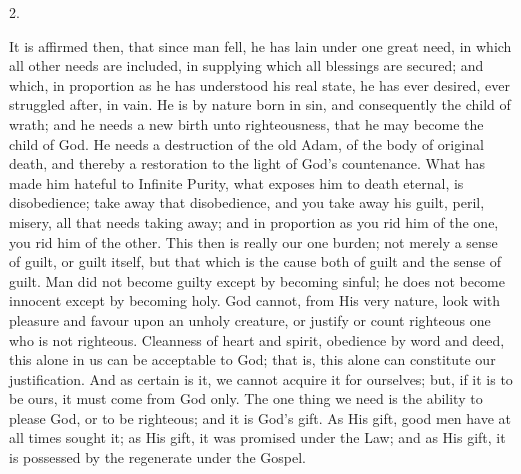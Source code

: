 2.

It is affirmed then, that since man fell, he has lain under one
great need, in which all other needs are included, in supplying which
all blessings are secured; and which, in proportion as he has
understood his real state, he has ever desired, ever struggled after,
in vain. He is by nature born in sin, and consequently the child of
wrath; and he needs a new birth unto righteousness, that he may become
the child of God. He needs a destruction of the old Adam, of the body
of original death, and thereby a restoration to the light of God's
countenance. What has made him hateful to Infinite Purity, what
exposes him to death eternal, is disobedience; take away that
disobedience, and you take away his guilt, peril, misery, all that
needs taking away; and in proportion as you rid him of the one, you
rid him of the other. This then is really our one burden; not merely a
sense of guilt, or guilt itself, but that which is the cause both of
guilt and the sense of guilt. Man did not become guilty except by
becoming sinful; he does not become innocent except by becoming holy.
God cannot, from His very nature, look with pleasure and favour upon
an unholy creature, or justify or count righteous one who is not
righteous. Cleanness of heart and spirit, obedience by word and deed,
this alone in us can be acceptable to God; that is, this alone can
constitute our justification. And as certain is it, we cannot acquire it for ourselves; but, if it is to be ours, it must come from
God only. The one thing we need is the ability to please God, or to be
righteous; and it is God's gift. As His gift, good men have at all
times sought it; as His gift, it was promised under the Law; and as
His gift, it is possessed by the regenerate under the Gospel.

